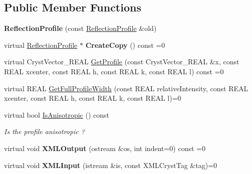 \subsection*{Public Member Functions}
\begin{DoxyCompactItemize}
\item 
\mbox{\label{class_obj_cryst_1_1_reflection_profile_a4647aa58d8e98429b10c54499b9b050e}} 
{\bfseries Reflection\+Profile} (const \mbox{\hyperlink{class_obj_cryst_1_1_reflection_profile}{Reflection\+Profile}} \&old)
\item 
\mbox{\label{class_obj_cryst_1_1_reflection_profile_a620f88c536f3c13881262efd155cc504}} 
virtual \mbox{\hyperlink{class_obj_cryst_1_1_reflection_profile}{Reflection\+Profile}} $\ast$ {\bfseries Create\+Copy} () const =0
\item 
virtual Cryst\+Vector\+\_\+\+R\+E\+AL \mbox{\hyperlink{class_obj_cryst_1_1_reflection_profile_a0c71ddbfb976e320ccedf907b741b4d5}{Get\+Profile}} (const Cryst\+Vector\+\_\+\+R\+E\+AL \&x, const R\+E\+AL xcenter, const R\+E\+AL h, const R\+E\+AL k, const R\+E\+AL l) const =0
\item 
virtual R\+E\+AL \mbox{\hyperlink{class_obj_cryst_1_1_reflection_profile_ac6d2a69e63c3efd06f30ab134062bbc0}{Get\+Full\+Profile\+Width}} (const R\+E\+AL relative\+Intensity, const R\+E\+AL xcenter, const R\+E\+AL h, const R\+E\+AL k, const R\+E\+AL l)=0
\item 
\mbox{\label{class_obj_cryst_1_1_reflection_profile_a63364909d31445c5cc8faceb07ffee3f}} 
virtual bool \mbox{\hyperlink{class_obj_cryst_1_1_reflection_profile_a63364909d31445c5cc8faceb07ffee3f}{Is\+Anisotropic}} () const
\begin{DoxyCompactList}\small\item\em Is the profile anisotropic ? \end{DoxyCompactList}\item 
\mbox{\label{class_obj_cryst_1_1_reflection_profile_a60e429bb999a8b39f09ef14cdaf5ad0c}} 
virtual void {\bfseries X\+M\+L\+Output} (ostream \&os, int indent=0) const =0
\item 
\mbox{\label{class_obj_cryst_1_1_reflection_profile_a7ad38593ddb4601632beb0a6bcae50f3}} 
virtual void {\bfseries X\+M\+L\+Input} (istream \&is, const X\+M\+L\+Cryst\+Tag \&tag)=0
\end{DoxyCompactItemize}


